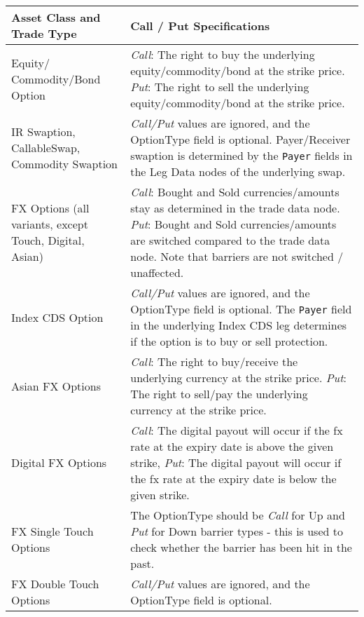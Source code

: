 \begin{itemize}
\begin{table}[H]
\centering
\begin{tabu} to 0.9\linewidth {| X[-1.5,l,m] | X[-5,l,m] |}
    \hline
      \bfseries{Asset Class and Trade Type}  & \bfseries{Call / Put Specifications} \\  \hline
Equity/ Commodity/Bond Option & \emph{Call}: The right to buy the underlying equity/commodity/bond at the strike price.
\newline \emph{Put}: The right to sell the underlying equity/commodity/bond at the strike price. \\  \hline
 IR Swaption, CallableSwap, Commodity Swaption&  \emph{Call/Put} values are ignored, and the OptionType field is optional. Payer/Receiver swaption is determined by the  \lstinline!Payer! fields in the Leg Data nodes of the underlying swap. \\ \hline
FX Options (all variants, except Touch, Digital, Asian) &  \emph{Call}: Bought and Sold currencies/amounts stay as determined in the trade data node. 
\newline \emph{Put}: Bought and Sold currencies/amounts are switched compared to the trade data node. Note that barriers are not switched / unaffected. \\ \hline
Index CDS Option &  \emph{Call/Put} values are ignored, and the OptionType field is optional. The \lstinline!Payer! field in the underlying Index CDS leg  determines if the option is to buy or sell protection. \\ \hline
Asian FX Options &  \emph{Call}: The right to buy/receive the underlying currency at the strike price.  \newline \emph{Put}: The right to sell/pay  the underlying currency at the strike price.   \\ \hline
Digital FX Options &  \emph{Call}: The digital payout will occur if the fx rate at the expiry date is above the given
strike, \newline \emph{Put}: The digital payout will occur if the fx rate at the expiry date is below the given strike.   \\ \hline
FX Single Touch Options &  The OptionType should be \emph{Call} for Up and \emph{Put} for Down barrier types - this is used to check whether the barrier has been hit in the past.   \\ \hline
FX Double Touch Options &  \emph{Call/Put} values are ignored, and the OptionType field is optional.  \\ \hline


\end{tabu}
\end{table}
\end{itemize}
